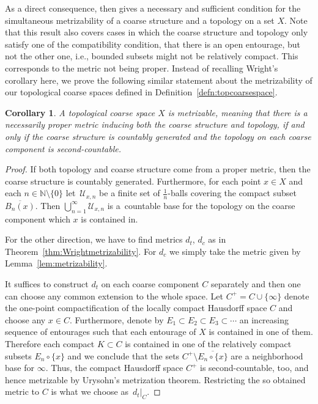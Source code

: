 \documentclass[pdftex]{sigma}
\numberwithin{equation}{section}
\newtheorem{cor}[thm]{Corollary}
\theoremstyle{definition}
\newcommand{\N}{\mathbb{N}}
\newcommand{\cU}{\mathcal{U}}
\begin{document}
As a direct consequence, \cite[Corollary 2.6]{Wright_Simul} then gives a necessary and sufficient condition for the simultaneous metrizability of a coarse structure and a topology on a set $X$.
Note that this result also covers cases in which the coarse structure and topology only satisfy one of the compatibility condition, that there is an open entourage, but not the other one, i.e., bounded subsets might not be relatively compact. This corresponds to the metric not being proper.
Instead of recalling Wright's corollary here, we prove the following similar statement about the metrizability of our topological coarse spaces defined in Definition~\ref{defn:topcoarsespace}.

\begin{cor}%
A topological coarse space $X$ is metrizable, meaning that there is a necessarily proper metric inducing both the coarse structure and topology, if and only if the coarse structure is countably generated and the topology on each coarse component is second-countable.
\end{cor}

\begin{proof}
If both topology and coarse structure come from a proper metric, then the coarse structure is countably generated.
Furthermore, for each point $x\in X$ and each $n\in\N\setminus\{0\}$ let~$\cU_{x,n}$ be a finite set of $\frac1n$-balls covering the compact subset $\overline{B_n(x)}$. Then $\bigcup_{n=1}^\infty\cU_{x,n}$ is a~countable base for the topology on the coarse component which $x$ is contained in.

For the other direction, we have to find metrics $d_t$, $d_c$ as in Theorem~\ref{thm:Wrightmetrizability}. For $d_c$ we simply take the metric given by Lemma~\ref{lem:metrizability}.

It suffices to construct $d_t$ on each coarse component $C$ separately and then one can choose any common extension to the whole space. Let $C^+=C\cup \{\infty\}$ denote the one-point compactification of the locally compact Hausdorff space $C$ and choose any $x\in C$.
Furthermore, denote by $E_1\subset E_2\subset E_3\subset\cdots$ an increasing sequence of entourages such that each entourage of $X$ is contained in one of them. Therefore each compact $K\subset C$ is contained in one of the relatively compact subsets $E_n\circ \{x\}$ and we conclude that the sets $C^+\setminus \overline{E_n\circ \{x\}}$ are a neighborhood base for $\infty$. Thus, the compact Hausdorff space $C^+$ is second-countable, too, and hence metrizable by Urysohn's metrization theorem. Restricting the so obtained metric to $C$ is what we choose as~$d_t|_C$.
\end{proof}
\end{document}
